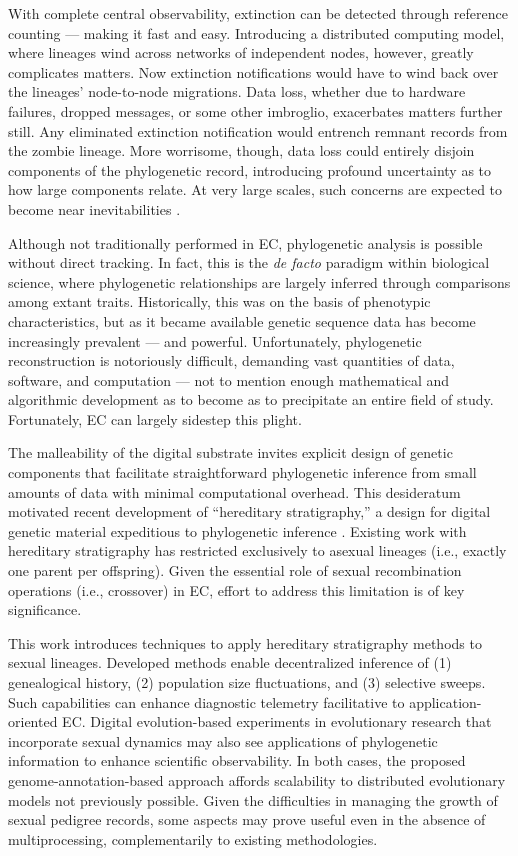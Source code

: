 With complete central observability, extinction can be detected through reference counting --- making it fast and easy.
Introducing a distributed computing model, where lineages wind across networks of independent nodes, however, greatly complicates matters.
Now extinction notifications would have to wind back over the lineages' node-to-node migrations.
Data loss, whether due to hardware failures, dropped messages, or some other imbroglio, exacerbates matters further still.
Any eliminated extinction notification would entrench remnant records from the zombie lineage.
More worrisome, though, data loss could entirely disjoin components of the phylogenetic record, introducing profound uncertainty as to how large components relate.
At very large scales, such concerns are expected to become near inevitabilities \citep{gropp2013programming}.

Although not traditionally performed in EC, phylogenetic analysis is possible without direct tracking.
In fact, this is the \textit{de facto} paradigm within biological science, where phylogenetic relationships are largely inferred through comparisons among extant traits.
Historically, this was on the basis of phenotypic characteristics, but as it became available genetic sequence data has become increasingly prevalent --- and powerful.
Unfortunately, phylogenetic reconstruction is notoriously difficult, demanding vast quantities of data, software, and computation --- not to mention enough mathematical and algorithmic development as to become as to precipitate an entire field of study.
Fortunately, EC can largely sidestep this plight.

The malleability of the digital substrate invites explicit design of genetic components that facilitate straightforward phylogenetic inference from small amounts of data with minimal computational overhead.
This desideratum motivated recent development of ``hereditary stratigraphy,'' a design for digital genetic material expeditious to phylogenetic inference \citep{moreno2022hereditary}.
Existing work with hereditary stratigraphy has restricted exclusively to asexual lineages (i.e., exactly one parent per offspring).
Given the essential role of sexual recombination operations (i.e., crossover) in EC, effort to address this limitation is of key significance.

This work introduces techniques to apply hereditary stratigraphy methods to sexual lineages.
Developed methods enable decentralized inference of (1) genealogical history, (2) population size fluctuations, and (3) selective sweeps.
Such capabilities can enhance diagnostic telemetry facilitative to application-oriented EC.
Digital evolution-based experiments in evolutionary research that incorporate sexual dynamics may also see applications of phylogenetic information to enhance scientific observability.
In both cases, the proposed genome-annotation-based approach affords scalability to distributed evolutionary models not previously possible.
Given the difficulties in managing the growth of sexual pedigree records, some aspects may prove useful even in the absence of multiprocessing, complementarily to existing methodologies.
